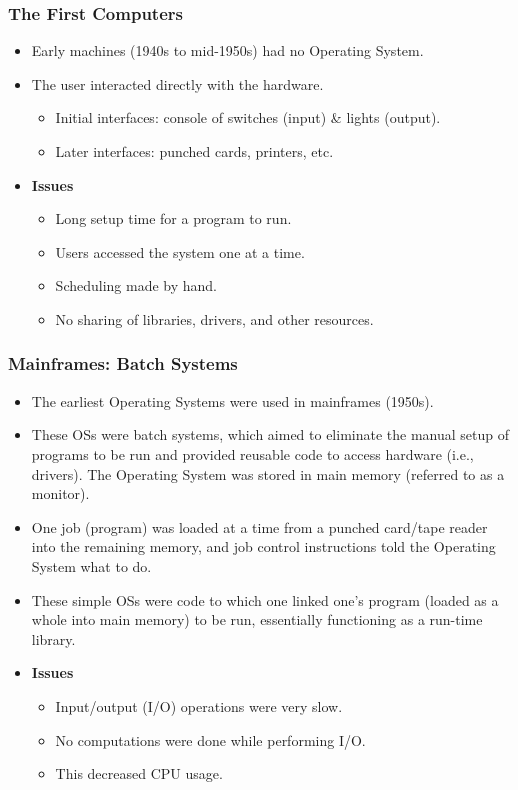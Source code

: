 \documentclass[11pt]{article}
\theoremstyle{definition}
\begin{document}
   \subsubsection{The First Computers}
        \begin{itemize}
            \item Early machines (1940s to mid-1950s) had no Operating System.
            \item The user interacted directly with the hardware.
            \begin{itemize}
                \item Initial interfaces: console of switches (input) \& lights (output).
                \item Later interfaces: punched cards, printers, etc.
            \end{itemize}
            \clearpage
            \item \textbf{Issues}
            \begin{itemize}
                \item Long setup time for a program to run.
                \item Users accessed the system one at a time.
                \item Scheduling made by hand.
                \item No sharing of libraries, drivers, and other resources.
            \end{itemize}
        \end{itemize}
    \subsubsection{Mainframes: Batch Systems}
    \begin{itemize}
        \item The earliest Operating Systems were used in mainframes (1950s).
        \item These OSs were batch systems, which aimed to eliminate the manual setup of programs to be run and provided reusable code to access hardware (i.e., drivers). The Operating System was stored in main memory (referred to as a monitor).
        \item One job (program) was loaded at a time from a punched card/tape reader into the remaining memory, and job control instructions told the Operating System what to do.
        \item These simple OSs were code to which one linked one's program (loaded as a whole into main memory) to be run, essentially functioning as a run-time library.
        \item \textbf{Issues}
            \begin{itemize}
                \item Input/output (I/O) operations were very slow.
                \item No computations were done while performing I/O.
                \item This decreased CPU usage.
            \end{itemize}
    \end{itemize}
\end{document}
